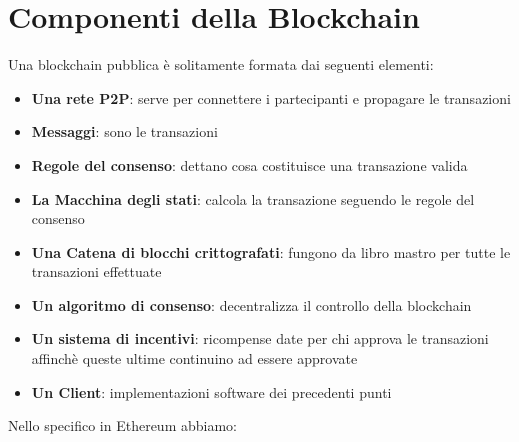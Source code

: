 \section{Componenti della Blockchain}

Una blockchain pubblica è solitamente formata dai seguenti elementi:

\begin{itemize}
    \item \textbf{Una rete P2P}: serve per connettere i partecipanti e propagare le transazioni
    \item \textbf{Messaggi}: sono le transazioni
    \item \textbf{Regole del consenso}: dettano cosa costituisce una transazione valida
    \item \textbf{La Macchina degli stati}: calcola la transazione seguendo le regole del consenso
    \item \textbf{Una Catena di blocchi crittografati}: fungono da libro mastro per tutte
          le transazioni effettuate
    \item \textbf{Un algoritmo di consenso}: decentralizza il controllo della blockchain
    \item \textbf{Un sistema di incentivi}: ricompense date per chi approva le transazioni
          affinchè queste ultime continuino ad essere approvate
    \item \textbf{Un Client}: implementazioni software dei precedenti punti
\end{itemize}

Nello specifico in Ethereum abbiamo:


